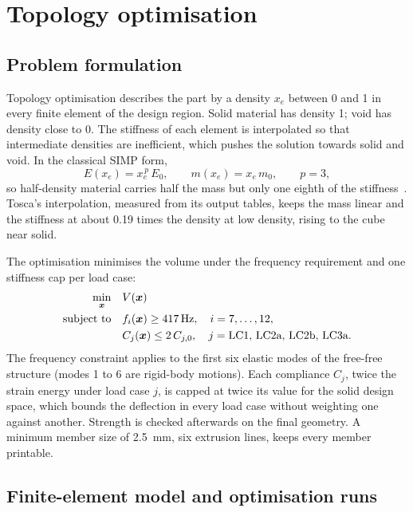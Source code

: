 \section{Topology optimisation}\label{sec:topopt}

\subsection{Problem formulation}

Topology optimisation describes the part by a density $x_e$ between 0 and 1 in every finite element of the design region. Solid material has density 1; void has density close to 0. The stiffness of each element is interpolated so that intermediate densities are inefficient, which pushes the solution towards solid and void. In the classical SIMP form,
\begin{equation}
E(x_e) = x_e^{\,p}\,E_0, \qquad m(x_e) = x_e\, m_0, \qquad p = 3,
\end{equation}
so half-density material carries half the mass but only one eighth of the stiffness~\citep{bendsoe_sigmund}. Tosca's interpolation, measured from its output tables, keeps the mass linear and the stiffness at about 0.19 times the density at low density, rising to the cube near solid.

The optimisation minimises the volume under the frequency requirement and one stiffness cap per load case:
\begin{align}
\min_{\boldsymbol{x}} \quad & V(\boldsymbol{x}) \nonumber\\
\text{subject to} \quad & f_i(\boldsymbol{x}) \ge \SI{417}{Hz}, \quad i = 7,\dots,12,\\
& C_j(\boldsymbol{x}) \le 2\,C_{j,0}, \quad j = \text{LC1, LC2a, LC2b, LC3a}. \nonumber
\end{align}
The frequency constraint applies to the first six elastic modes of the free-free structure (modes 1 to 6 are rigid-body motions). Each compliance $C_j$, twice the strain energy under load case $j$, is capped at twice its value for the solid design space, which bounds the deflection in every load case without weighting one against another. Strength is checked afterwards on the final geometry. A minimum member size of \SI{2.5}{mm}, six extrusion lines, keeps every member printable.

\subsection{Finite-element model and optimisation runs}

